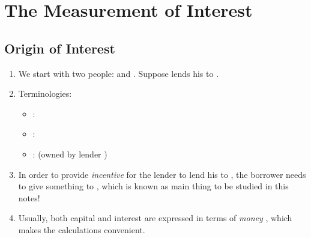 \section{The Measurement of Interest}
\label{sect:interest-measurement}
\subsection{Origin of Interest}
\begin{enumerate}
\item We start with two people:  and . Suppose
 lends his  to .
\item Terminologies:
\begin{itemize}
\item {}: 
\item {}: 
\item {}:  (owned by lender )
\end{itemize}

\item In order to provide \emph{incentive} for the lender  to lend
his  to , the borrower  needs
to give something to , which is known as 
 main thing to be studied in this notes!

\item Usually, both capital and interest are expressed in terms of \emph{money}
, which makes the calculations convenient.
\end{enumerate}
